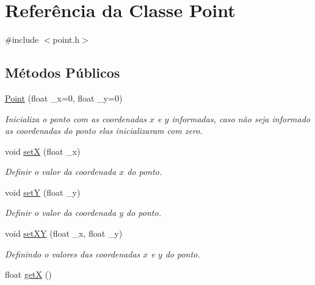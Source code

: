 \hypertarget{class_point}{}\section{Referência da Classe Point}
\label{class_point}


{\ttfamily \#include $<$point.\+h$>$}

\subsection*{Métodos Públicos}
\begin{DoxyCompactItemize}
\item 
\hyperlink{class_point_a06c32166c2ad9eac25799ef189b49683}{Point} (float \+\_\+x=0, float \+\_\+y=0)\hypertarget{class_point_a06c32166c2ad9eac25799ef189b49683}{}\label{class_point_a06c32166c2ad9eac25799ef189b49683}

\begin{DoxyCompactList}\small\item\em Inicializa o ponto com as coordenadas $x$ e $y$ informadas, caso não seja informado as coordenadas do ponto elas inicializaram com zero. \end{DoxyCompactList}\item 
void \hyperlink{class_point_a428a1676e2fdec6753c42011a1d59d18}{setX} (float \+\_\+x)\hypertarget{class_point_a428a1676e2fdec6753c42011a1d59d18}{}\label{class_point_a428a1676e2fdec6753c42011a1d59d18}

\begin{DoxyCompactList}\small\item\em Definir o valor da coordenada $x$ do ponto. \end{DoxyCompactList}\item 
void \hyperlink{class_point_a9868c4601b0ea0c2d0de20fe41ee0e49}{setY} (float \+\_\+y)\hypertarget{class_point_a9868c4601b0ea0c2d0de20fe41ee0e49}{}\label{class_point_a9868c4601b0ea0c2d0de20fe41ee0e49}

\begin{DoxyCompactList}\small\item\em Definir o valor da coordenada $y$ do ponto. \end{DoxyCompactList}\item 
void \hyperlink{class_point_ab5385c6d9bfa841e641e4709fc9f14cc}{set\+XY} (float \+\_\+x, float \+\_\+y)\hypertarget{class_point_ab5385c6d9bfa841e641e4709fc9f14cc}{}\label{class_point_ab5385c6d9bfa841e641e4709fc9f14cc}

\begin{DoxyCompactList}\small\item\em Definindo o valores das coordenadas $x$ e $y$ do ponto. \end{DoxyCompactList}\item 
float \hyperlink{class_point_acc27466778cc87a662bba40268c4c0c8}{getX} ()\hypertarget{class_point_acc27466778cc87a662bba40268c4c0c8}{}\label{class_point_acc27466778cc87a662bba40268c4c0c8}


\end{DoxyCompactItemize}
